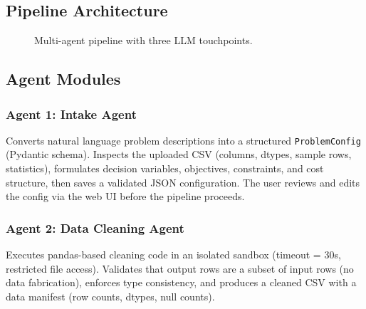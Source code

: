 \documentclass[11pt, letterpaper]{article}
\begin{document}
\subsection{Pipeline Architecture}

\begin{figure}[H]
\centering
{}
\caption{Multi-agent pipeline with three LLM touchpoints.}
\label{fig:pipeline}
\end{figure}

\subsection{Agent Modules}

\subsubsection{Agent 1: Intake Agent}
Converts natural language problem descriptions into a structured \texttt{ProblemConfig} (Pydantic schema). Inspects the uploaded CSV (columns, dtypes, sample rows, statistics), formulates decision variables, objectives, constraints, and cost structure, then saves a validated JSON configuration. The user reviews and edits the config via the web UI before the pipeline proceeds.

\subsubsection{Agent 2: Data Cleaning Agent}
Executes pandas-based cleaning code in an isolated sandbox (timeout = 30s, restricted file access). Validates that output rows are a subset of input rows (no data fabrication), enforces type consistency, and produces a cleaned CSV with a data manifest (row counts, dtypes, null counts).
\end{document}
